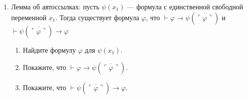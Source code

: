 \documentclass[10pt,a4paper,oneside]{article}
\begin{document}
\begin{enumerate}
\item Лемма об автоссылках: пусть $\psi(x_1)$ --- формула с единственной свободной переменной $x_1$. Тогда существует формула $\varphi$, что
$\vdash \varphi \rightarrow \psi(\overline{\ulcorner\varphi\urcorner})$ и $\vdash \psi(\overline{\ulcorner\varphi\urcorner}) \rightarrow \varphi$
\begin{enumerate}
\item Найдите формулу $\varphi$ для $\psi(x_1)$.
\item Покажите, что $\vdash \varphi \rightarrow \psi(\overline{\ulcorner\varphi\urcorner})$.
\item Покажите, что $\vdash \psi(\overline{\ulcorner\varphi\urcorner}) \rightarrow \varphi$.
\end{enumerate}
\end{enumerate}
\end{document}
